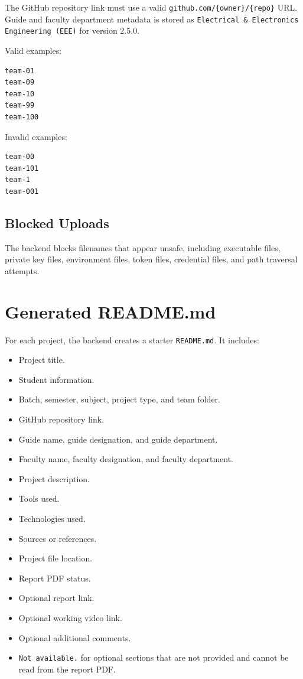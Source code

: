 \documentclass[12pt,a4paper]{article}
\begin{document}
The GitHub repository link must use a valid \texttt{github.com/\{owner\}/\{repo\}} URL. Guide and faculty department metadata is stored as \texttt{Electrical \& Electronics Engineering (EEE)} for version 2.5.0.

Valid examples:

\begin{lstlisting}
team-01
team-09
team-10
team-99
team-100
\end{lstlisting}

Invalid examples:

\begin{lstlisting}
team-00
team-101
team-1
team-001
\end{lstlisting}

\subsection{Blocked Uploads}

The backend blocks filenames that appear unsafe, including executable files, private key files, environment files, token files, credential files, and path traversal attempts.

\section{Generated README.md}

For each project, the backend creates a starter \texttt{README.md}. It includes:

\begin{itemize}[leftmargin=*]
    \item Project title.
    \item Student information.
    \item Batch, semester, subject, project type, and team folder.
    \item GitHub repository link.
    \item Guide name, guide designation, and guide department.
    \item Faculty name, faculty designation, and faculty department.
    \item Project description.
    \item Tools used.
    \item Technologies used.
    \item Sources or references.
    \item Project file location.
    \item Report PDF status.
    \item Optional report link.
    \item Optional working video link.
    \item Optional additional comments.
    \item \texttt{Not available.} for optional sections that are not provided and cannot be read from the report PDF.
\end{itemize}
\end{document}
